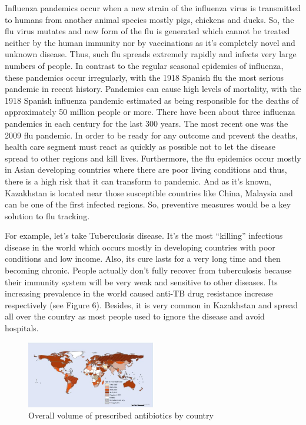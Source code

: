 Influenza pandemics occur when a new strain of the influenza virus is transmitted to humans from another animal species mostly pigs, chickens and ducks. So, the flu virus mutates and new form of the flu is generated which cannot be treated neither by the human immunity nor by vaccinations as it’s completely novel and unknown disease. Thus, such flu spreads extremely rapidly and infects very large numbers of people. In contrast to the regular seasonal epidemics of influenza, these pandemics occur irregularly, with the 1918 Spanish flu the most serious pandemic in recent history. Pandemics can cause high levels of mortality, with the 1918 Spanish influenza pandemic estimated as being responsible for the deaths of approximately 50 million people or more. There have been about three influenza pandemics in each century for the last 300 years. The most recent one was the 2009 flu pandemic. In order to be ready for any outcome and prevent the deaths, health care segment must react as quickly as possible not to let the disease spread to other regions and kill lives. Furthermore, the flu epidemics occur mostly in Asian developing countries where there are poor living conditions and thus, there is a high risk that it can transform to pandemic. And as it’s known, Kazakhstan is located near those susceptible countries like China, Malaysia and can be one of the first infected regions. So, preventive measures would be a key solution to flu tracking.

For example, let’s take Tuberculosis disease. It’s the most “killing” infectious disease in the world which occurs mostly in developing countries with poor conditions and low income. Also, its cure lasts for a very long time and then becoming chronic. People actually don’t fully recover from tuberculosis because their immunity system will be very weak and sensitive to other diseases. Its increasing prevalence in the world caused anti-TB drug resistance increase respectively (see Figure 6). Besides, it is very common in Kazakhstan and spread all over the country as most people used to ignore the disease and avoid hospitals.

\begin{figure}[H]
  \centering
  \includegraphics[width=0.5\textwidth]{img/Fig6}
  \caption{Overall volume of prescribed antibiotics by country}
  \label{fig6}
\end{figure}

